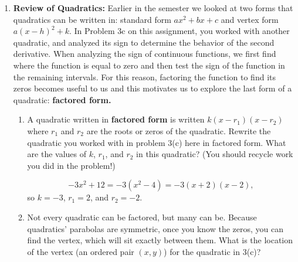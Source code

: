 \documentclass{article}
\begin{document}
\begin{enumerate}
\begin{enumerate}
  \item

    \begin{grading}
      1 point. (Since it's exploratory, full credit for any answer.) 
    \end{grading}

    \begin{problem}[\stretch{0.4}]
      (Exploratory) Does your graph support your guess from \ref{limit-intro-numerical-guess}? Explain. 
    \end{problem}

    \begin{solution}
      Looking at the graph, as $x$ approaches $2$, $f(x)$ approaches the value $\frac{1}{4}$. This supports
      our guess that $\lim\limits_{x \to 2} f(x) = 0.25$. 
    \end{solution}

  \end{enumerate}  
\item 
{\bf Review of Quadratics:} Earlier in the semester we looked at two forms that quadratics can be written in: standard form $ax^2+bx+c$ and vertex form $a(x-h)^2+k$. In Problem 3c on this assignment, you worked with another quadratic, and analyzed its sign to determine the behavior of the second derivative. When analyzing the sign of continuous functions, we first find where the function is equal to zero and then test the sign of the function in the remaining intervals. For this reason, factoring the function to find its zeros becomes useful to us and this motivates us to explore the last form of a quadratic: {\bf factored form.}
\begin{enumerate}
    \item A quadratic written in {\bf factored form} is written $k(x-r_1)(x-r_2)$ where $r_1$ and $r_2$ are the roots or zeros of the quadratic. Rewrite the quadratic you worked with in problem 3(c) here in factored form. What are the values of $k$, $r_1$, and $r_2$ in this quadratic? (You should recycle work you did in the problem!)
    \begin{problemonly}
         \vfill
    \end{problemonly}

    \begin{solution}
        $$-3x^2 + 12 = -3(x^2-4)=-3(x+2)(x-2),$$
        so $k = -3$, $r_1 = 2$, and $r_2 = -2$.
    \end{solution}
   
    \item Not every quadratic can be factored, but many can be. Because quadratics' parabolas are symmetric, once you know the zeros, you can find the vertex, which will sit exactly between them. What is the location of the vertex (an ordered pair $(x,y)$) for the quadratic in 3(c)?
    \begin{problemonly}
         \vfill \newpage
    \end{problemonly}


\end{enumerate}
\end{enumerate}
\end{document}
